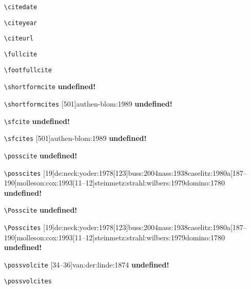 \documentclass[a4paper,12pt]{scrartcl}
\newcommand*{\Befehl}[1]{\texttt{\textbackslash#1}}
\begin{document}
\begin{enumerate}
    \item[\footnotesize\Befehl{citedate}] 
    \item[\footnotesize\Befehl{citeyear}] \citeyear{auler:hiller:2015}
    \item[\footnotesize\Befehl{citeurl}] 
    \item[\footnotesize\Befehl{fullcite}] 
    \item[\footnotesize\Befehl{footfullcite}] 
    \item[\footnotesize\Befehl{shortformcite}] 
        {}
        {\textbf{undefined!}}%
    \item[\footnotesize\Befehl{shortformcites}] 
        {[501]{authen-blom:1989}}
        {\textbf{undefined!}}%
    \item[\footnotesize\Befehl{sfcite}] 
        {}
        {\textbf{undefined!}}%
    \item[\footnotesize\Befehl{sfcites}] 
        {[501]{authen-blom:1989}}
        {\textbf{undefined!}}%
    \item[\footnotesize\Befehl{posscite}] 
        {}
        {\textbf{undefined!}}%
    \item[\footnotesize\Befehl{posscites}] 
        {[19]{de:neck:yoder:1978}[123]{buss:2004}{nass:1938}{caselitz:1980a}[187--190]{molleson:cox:1993}[11--12]{steinmetz:strahl:wilbers:1979}{domino:1780}}
        {\textbf{undefined!}}%
    \item[\footnotesize\Befehl{Posscite}] 
        {}
        {\textbf{undefined!}}%
    \item[\footnotesize\Befehl{Posscites}] 
        {[19]{de:neck:yoder:1978}[123]{buss:2004}{nass:1938}{caselitz:1980a}[187--190]{molleson:cox:1993}[11--12]{steinmetz:strahl:wilbers:1979}{domino:1780}}
        {\textbf{undefined!}}%
	\item[\footnotesize\Befehl{possvolcite}] 
        {[34--36]{van:der:linde:1874}}
        {\textbf{undefined!}}%
    \item[\footnotesize\Befehl{possvolcites}] 

\end{enumerate}
\end{document}
